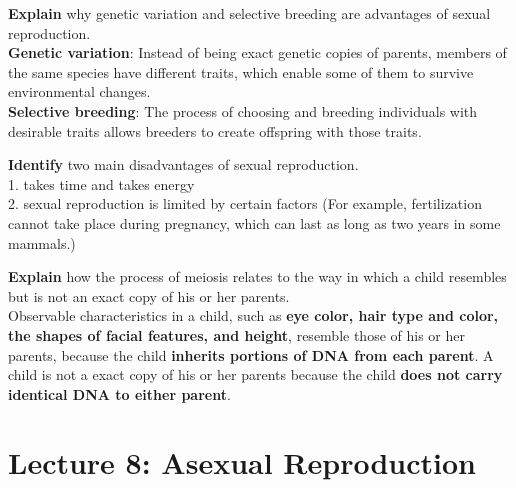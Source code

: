 \documentclass[
]{book}
\begin{document}
\textbf{Explain} why genetic variation and selective breeding are advantages of sexual reproduction.\\
\textbf{Genetic variation}: Instead of being exact genetic copies of parents, members of the same species have different traits, which enable some of them to survive environmental changes.\\
\textbf{Selective breeding}: The process of choosing and breeding individuals with desirable traits allows breeders to create offspring with those traits.

\textbf{Identify} two main disadvantages of sexual reproduction.\\
1. takes time and takes energy\\
2. sexual reproduction is limited by certain factors (For example, fertilization cannot take place during pregnancy, which can last as long as two years in some mammals.)

\textbf{Explain} how the process of meiosis relates to the way in which a child resembles but is not an exact copy of his or her parents.\\
Observable characteristics in a child, such as \textbf{eye color, hair type and color, the shapes of facial features, and height}, resemble those of his or her parents, because the child \textbf{inherits portions of DNA from each parent}. A child is not a exact copy of his or her parents because the child \textbf{does not carry identical DNA to either parent}.

\hypertarget{lecture-8-asexual-reproduction}{%
\section{Lecture 8: Asexual Reproduction}\label{lecture-8-asexual-reproduction}}

  
\end{document}
